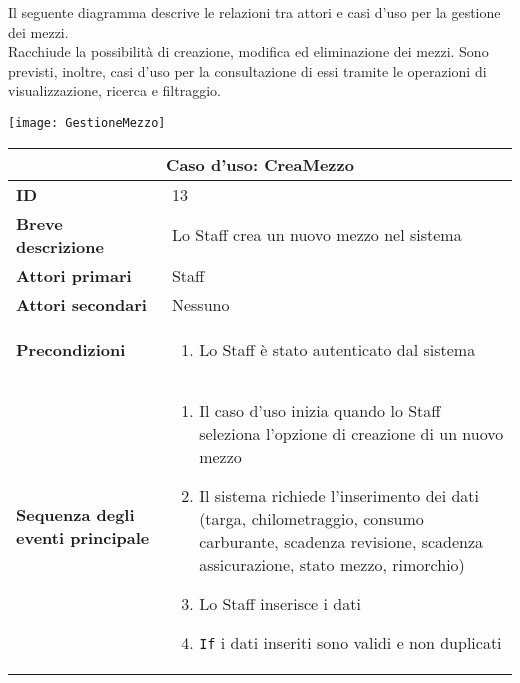 \documentclass[a4paper]{report}
\begin{document}
\clearpage
{}

Il seguente diagramma descrive le relazioni tra attori e casi d’uso per la gestione dei mezzi.\\ 
Racchiude la possibilità di creazione, modifica ed eliminazione dei mezzi. Sono previsti, inoltre, casi d’uso per la consultazione di essi tramite le operazioni di visualizzazione, ricerca e filtraggio.


\begin{figure*}[ht]
    \centering
    \texttt{[image: GestioneMezzo]}
\end{figure*}

\clearpage
\begin{table}[H]
\vspace*{-0cm}
\renewcommand{\arraystretch}{1.9}
\begin{tabular}{|p{3.9cm}|p{9.9cm}|}
\hline
\multicolumn{2}{|c|}{\textbf{Caso d’uso: CreaMezzo}} \\ \hline
	\textbf{ID} & 13 \\ \hline
	\textbf{Breve descrizione} & Lo Staff crea un nuovo mezzo nel sistema \\ \hline
	\textbf{Attori primari} & Staff \\ \hline
	\textbf{Attori secondari} & Nessuno \\ \hline
	\textbf{Precondizioni} & \begin{enumerate}[label=\arabic*.,leftmargin=14pt,labelsep=0.5em,topsep=0pt,partopsep=0pt,parsep=0pt,itemsep=0pt]
        \item Lo Staff è stato autenticato dal sistema
    \end{enumerate} \\ \hline
	\textbf{Sequenza degli eventi principale} &
\begin{enumerate}[leftmargin=14pt,label=\arabic*.,labelsep=0.5em,topsep=0pt,partopsep=0pt,parsep=0pt,itemsep=0pt]
    \item Il caso d’uso inizia quando lo Staff seleziona l'opzione di creazione di un nuovo mezzo
    \item Il sistema richiede l’inserimento dei dati (targa, chilometraggio, consumo carburante, scadenza revisione, scadenza assicurazione, stato mezzo, rimorchio)
    \item Lo Staff inserisce i dati
    \item \texttt{If} i dati inseriti sono validi e non duplicati
    \begin{enumerate}[label=\arabic{enumi}.\arabic*.,leftmargin=22pt,labelsep=0.5em,topsep=0pt,partopsep=0pt,parsep=0pt,itemsep=0pt]

\end{enumerate}
\end{enumerate}
\end{tabular}
\end{table}
\end{document}
